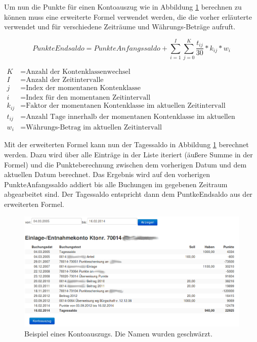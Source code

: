 \documentclass[12pt]{scrreprt}
\begin{document}
Um nun die Punkte für einen Kontoauszug wie in Abbildung \ref{account} berechnen zu können muss eine erweiterte Formel verwendet werden, die die vorher erläuterte verwendet und für verschiedene Zeiträume und Währungs-Beträge aufruft. 

\begin{equation*}
  PunkteEndsaldo = PunkteAnfangssaldo + \sum_{i=1}^{I} \sum_{j=0}^{K} \frac{t_{ij}}{30} * k_{ij} * w_i
\end{equation*}

\begin{align*}
 K &= \text{Anzahl der Kontenklassenwechsel} \\
 I &= \text{Anzahl der Zeitintervalle} \\
 j &= \text{Index der momentanen Kontenklasse} \\
 i &= \text{Index für den momentanen Zeitintervall} \\
 k_{ij} &= \text{Faktor der momentanen Kontenklasse im aktuellen Zeitintervall} \\
 t_{ij} &= \text{Anzahl Tage innerhalb der momentanen Kontenklasse im aktuellen Zeitintervall} \\
 w_i &= \text{Währungs-Betrag im aktuellen Zeitintervall} 
\end{align*}

Mit der erweiterten Formel kann nun der Tagessaldo in Abbildung \ref{account} berechnet werden. Dazu wird über alle Einträge in der Liste iteriert (äußere Summe in der Formel) und die Punkteberechnung zwischen dem vorherigen Datum und dem aktuellen Datum berechnet. Das Ergebnis wird auf den vorherigen PunkteAnfangssaldo addiert bis alle Buchungen im gegebenen Zeitraum abgearbeitet sind. Der Tagessaldo entspricht dann dem PuntkeEndsaldo aus der erweiterten Formel. \\

\begin{figure} 
  \includegraphics[width=\textwidth]{account-ano.png}
  \caption{Beispiel eines Kontoauszugs. Die Namen wurden geschwärzt.}
  \label{account}
\end{figure}
\end{document}
